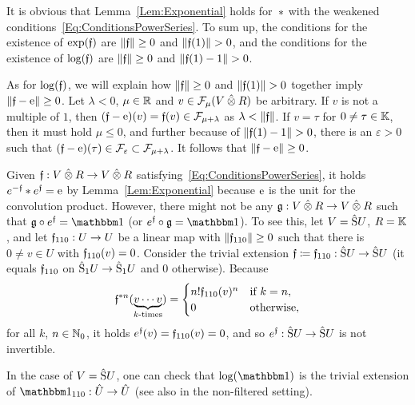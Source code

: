 \documentclass[\MainFolder/Text.tex]{subfiles}
\begin{document}
\begin{Remark}\label{Rem:ExpLogStar}
\begin{RemarkList}
\item It is obvious that Lemma~\ref{Lem:Exponential} holds for~$*$ with the weakened conditions~\eqref{Eq:ConditionsPowerSeries}. To sum up, the conditions for the existence of $\exp(\mathfrak{f})$ are $\| \mathfrak{f} \|\ge 0$ and $\Norm{\MVMorF(1)}>0$, and the conditions for the existence of $\log(\mathfrak{f})$ are $\| \mathfrak{f} \|\ge 0$ and $\Norm{\MVMorF(1) - 1}>0$.

As for $\log(\mathfrak{f})$, we will explain how $\| \mathfrak{f} \|\ge 0$ and $\Norm{\MVMorF(1)}>0$ together imply $\| \mathfrak{f} - \mathrm{e} \|\ge 0$. Let $\lambda < 0$, $\mu\in \mathbb{R}$ and $v\in \Filtr_{\mu}(V\COtimes R)$ be arbitrary. If $v$ is not a multiple of $1$, then $(\mathfrak{f} - \mathrm{e})(v) = \mathfrak{f}(v) \in \mathcal{F}_{\mu + \lambda}$ as $\lambda<\| \mathfrak{f} \|$. If $v = \tau$ for $0\neq\tau\in\mathbb{K}$, then it must hold $\mu \le 0$, and further because of $\Norm{\MVMorF(1)-1}>0$, there is an $\varepsilon>0$ such that $(\mathfrak{f} - \mathrm{e})(\tau) \in \mathcal{F}_\varepsilon \subset \mathcal{F}_{\mu + \lambda}$. It follows that $\| \mathfrak{f} - \mathrm{e} \|\ge 0$.

\item Given $\MVMorF: V\COtimes R \rightarrow V\COtimes R$ satisfying~\eqref{Eq:ConditionsPowerSeries}, it holds $e^{-\mathfrak{f}}* e^{\mathfrak{f}} = \mathrm{e}$ by Lemma~\ref{Lem:Exponential} because $\mathrm{e}$ is the unit for the convolution product. However, there might not be any $\MVMorG: V\COtimes R \rightarrow V\COtimes R$ such that $\MVMorG \circ e^{\MVMorF} = \Id$ (or $e^{\MVMorF}\circ\MVMorG = \Id$). To see this, let $V=\hat{\mathrm{S}} U$, $R=\mathbb{K}$, and let $\mathfrak{f}_{110}: U \rightarrow U$ be a linear map with $\| \mathfrak{f}_{110} \|\ge 0$ such that there is $0 \neq v\in U$ with $\mathfrak{f}_{110}(v)=0$. Consider the trivial extension $\mathfrak{f}\coloneqq \mathfrak{f}_{110}: \hat{\mathrm{S}}U\rightarrow\hat{\mathrm{S}}U$ (it equals $\mathfrak{f}_{110}$ on $\hat{\mathrm{S}}_1 U\rightarrow \hat{\mathrm{S}}_1 U$ and $0$ otherwise). Because
\[ \mathfrak{f}^{* n}(\underbrace{v \dotsb v}_{k\text{-times}}) = \begin{cases}
 n! \mathfrak{f}_{110}(v)^n & \text{if } k = n, \\
 0 & \text{otherwise},
\end{cases}\]
for all $k$, $n\in\mathbb{N}_0$, it holds $e^{\mathfrak{f}}(v) = \mathfrak{f}_{110}(v) = 0$, and so $e^{\mathfrak{f}}: \hat{\mathrm{S}}U\rightarrow \hat{\mathrm{S}}U$ is not invertible.

\item In the case of $V=\hat{\mathrm{S}}U$, one can check that $\log(\Id)$ is the trivial extension of $\Id_{110}: \hat{U}\rightarrow \hat{U}$ (see also \cite[Example~21]{Markl2015} in the non-filtered setting).\qedhere
\end{RemarkList}
\end{Remark}
\end{document}
